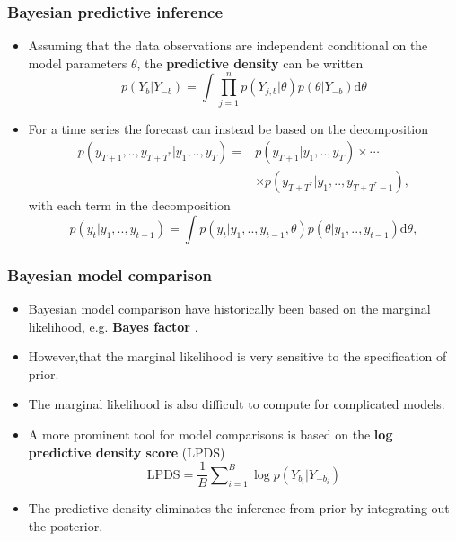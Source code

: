 \documentclass[11pt]{beamer}
\begin{document}
\begin{frame}
  \frametitle{Bayesian predictive inference}
  \begin{itemize}
  \item Assuming that the data observations are independent conditional on the
    model parameters $\theta$, the \textbf{predictive density} can be written
    \[
    p(Y_{b}|Y_{-b})=\int\prod_{j=1}^{n}p(Y_{j,b}|\theta)p(\theta|Y_{-b})\mathrm{d}\theta
    \]

  \item For a time series the forecast can instead be based on the
    decomposition
    \[
    \begin{split}
      p(y_{T+1},..,y_{T+T^{\ast}}|y_{1},..,y_{T})=&p(y_{T+1}|y_{1},..,y_{T})\times
      \cdots\\
      &\times p(y_{T+T^{\ast}}|y_{1},..,y_{T+T^{\ast}-1}),
    \end{split}
    \]
    with each term in the decomposition
    \[ p(y_{t}|y_{1},..,y_{t-1})=\int
    p(y_{t}|y_{1},..,y_{t-1},\theta)p(\theta|y_{1},..,y_{t-1})\mathrm{d}\theta,\]



  \end{itemize}

\end{frame}

\begin{frame}
  \frametitle{Bayesian model comparison}

  \begin{itemize}
  \item Bayesian model comparison have historically been based on the
    marginal likelihood, e.g. \textbf{Bayes factor} \citep{kass1993bayes}.

  \item However,that the marginal likelihood is very sensitive to the
    specification of prior.

  \item The marginal likelihood is also difficult to compute for
    complicated models.

  \item A more prominent tool for model comparisons is based on the \textbf{log
      predictive density score} (LPDS)
    \[
    \mathrm{LPDS}=\frac{1}{B}\sum\nolimits _{i=1}^{B}\log p(Y_{b_{i}}|Y_{-b_{i}})
    \]

  \item The predictive density eliminates the inference from prior by
    integrating out the posterior.



  \end{itemize}

\end{frame}
\end{document}
